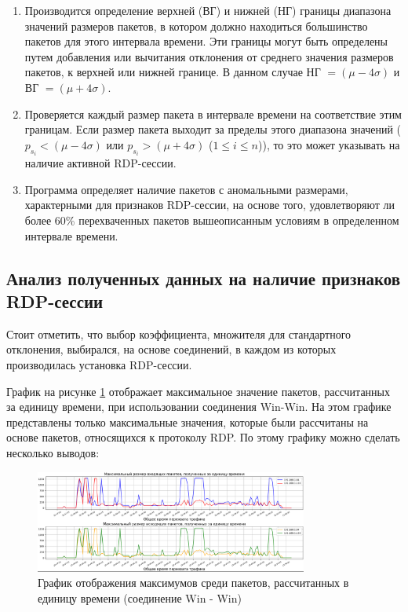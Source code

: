 \documentclass[bachelor, och, coursework]{SCWorks}
\begin{document}
\begin{enumerate}
  \item Производится определение верхней (ВГ) и нижней (НГ) границы диапазона значений размеров пакетов, в котором должно находиться 
  большинство пакетов для этого интервала времени. Эти границы могут быть определены путем добавления или вычитания отклонения 
  от среднего значения размеров пакетов, к верхней или нижней границе. В данном случае  НГ $= (\mu - 4\sigma)$ и ВГ $= (\mu + 4\sigma)$.
  \item Проверяется каждый размер пакета в интервале времени на соответствие этим границам. 
  Если размер пакета выходит за пределы этого диапазона значений ($p_{s_i} < (\mu - 4\sigma)$ или $p_{s_i} > (\mu + 4\sigma)$ ($1 \leq i \leq n$)), 
  то это может указывать на наличие активной RDP-сессии.
  \item Программа определяет наличие пакетов с аномальными размерами, характерными для признаков RDP-сессии, на основе того, удовлетворяют ли более 60\% 
  перехваченных пакетов вышеописанным условиям в определенном интервале времени.
\end{enumerate}

\subsection{Анализ полученных данных на наличие признаков RDP-сессии}

Стоит отметить, что выбор коэффициента, множителя для стандартного отклонения, выбирался, на основе соединений, в каждом из которых производилась 
установка RDP-сессии.

График на рисунке \ref{win-size} отображает максимальное значение пакетов, рассчитанных за единицу времени, при использовании соединения Win-Win. 
На этом графике представлены только максимальные значения, которые были рассчитаны на основе пакетов, относящихся к протоколу RDP. По этому 
графику можно сделать несколько выводов:


\begin{figure}[H]
  \centering
  \includegraphics[width=0.8\textwidth]{photo/size-win.png}
  \caption{График отображения максимумов среди пакетов, рассчитанных в единицу времени (соединение Win - Win)}
  \label{win-size}
\end{figure}
\end{document}
